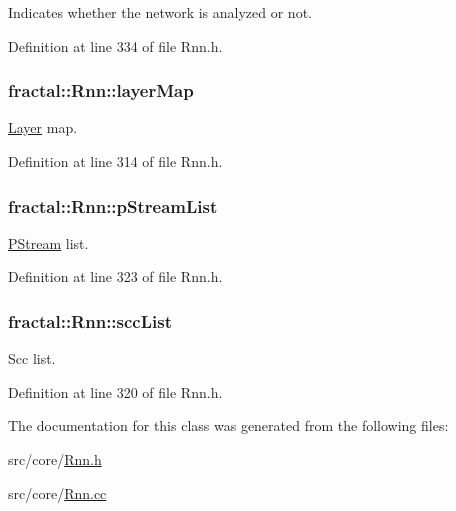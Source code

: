 Indicates whether the network is analyzed or not. 



Definition at line 334 of file Rnn.\+h.

\hypertarget{classfractal_1_1Rnn_ae1950b5b6ceb1b32a063d10b6e392f1d}{
\subsubsection[{layer\+Map}]{ fractal\+::\+Rnn\+::layer\+Map\hspace{0.3cm}{\ttfamily [protected]}}}\label{classfractal_1_1Rnn_ae1950b5b6ceb1b32a063d10b6e392f1d}


\hyperlink{classfractal_1_1Layer}{Layer} map. 



Definition at line 314 of file Rnn.\+h.

\hypertarget{classfractal_1_1Rnn_a0e876daf59f24181e88726b181b28748}{
\subsubsection[{p\+Stream\+List}]{ fractal\+::\+Rnn\+::p\+Stream\+List\hspace{0.3cm}{\ttfamily [protected]}}}\label{classfractal_1_1Rnn_a0e876daf59f24181e88726b181b28748}


\hyperlink{classfractal_1_1PStream}{P\+Stream} list. 



Definition at line 323 of file Rnn.\+h.

\hypertarget{classfractal_1_1Rnn_a796f665aead28ee054bd7eaec5270329}{
\subsubsection[{scc\+List}]{ fractal\+::\+Rnn\+::scc\+List\hspace{0.3cm}{\ttfamily [protected]}}}\label{classfractal_1_1Rnn_a796f665aead28ee054bd7eaec5270329}


Scc list. 



Definition at line 320 of file Rnn.\+h.



The documentation for this class was generated from the following files\+:\begin{DoxyCompactItemize}
\item 
src/core/\hyperlink{Rnn_8h}{Rnn.\+h}\item 
src/core/\hyperlink{Rnn_8cc}{Rnn.\+cc}\end{DoxyCompactItemize}
